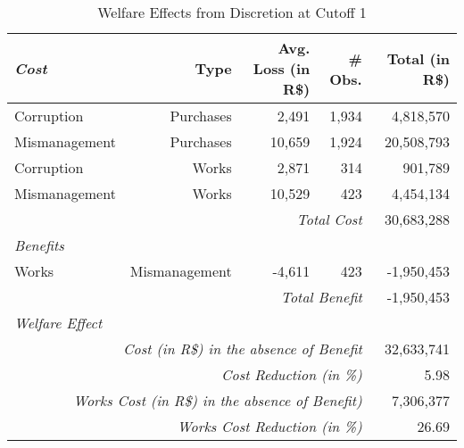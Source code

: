 \begin{table}[!htbp]
  \centering
  \caption{\label{tab:welfare}Welfare Effects from Discretion at Cutoff 1}
  \scriptsize
  \begin{tabular}{lrrrr}
  \hline

  \hline
  \emph{Cost}                                    & Type      & Avg. Loss (in R\$) & \# Obs. & Total (in R\$) \T \B \\
  \hline
  Corruption                                     & Purchases & 2,491              & 1,934   & 4,818,570  \T \B \\
  Mismanagement                                  & Purchases & 10,659             & 1,924   & 20,508,793 \T \B \\
  Corruption                                     & Works     & 2,871              & 314     & 901,789    \T \B \\
  Mismanagement                                  & Works     & 10,529             & 423     & 4,454,134  \T \B \\
  \hline
  \multicolumn{4}{r}{\emph{Total Cost}}          & 30,683,288 \T \B \\
  \emph{Benefits}                                &  &  &  &  \\
  \hline
  Works                                          & Mismanagement & -4,611 & 423 & -1,950,453 \T \B \\
  \hline
  \multicolumn{4}{r}{\emph{Total Benefit}}       & -1,950,453 \T \B \\
  \emph{Welfare Effect}                          &  &  &  &  \\
  \hline
  \multicolumn{4}{r}{\emph{Cost (in R\$) in the absence of Benefit}}        & 32,633,741 \T \B \\
  \multicolumn{4}{r}{\emph{Cost Reduction (in \%)}}                         & 5.98       \T \B \\
  \multicolumn{4}{r}{\emph{Works Cost (in R\$) in the absence of Benefit)}} & 7,306,377  \T \B \\
  \multicolumn{4}{r}{\emph{Works Cost Reduction (in \%)}}                   & 26.69      \T \B \\
  \hline

  \hline
  \end{tabular}

\end{table}
